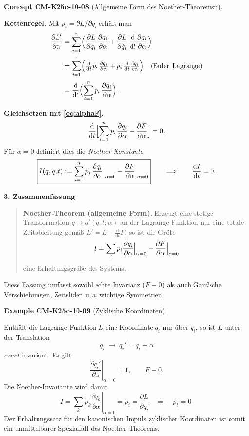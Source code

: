 \documentclass[10pt, letterpaper]{article}
\newcommand{\CustomHeading}[3]{%
  \par\medskip\noindent%
  \textbf{#1 #2} \textnormal{(#3)}.\enskip%
}
\newenvironment{EXA}[2]{\CustomHeading{Example}{#1}{#2}}{}
\newenvironment{CONC}[2]{\CustomHeading{Concept}{#1}{#2}}{}
\begin{document}
\begin{CONC}{CM-K25c-10-08}{Allgemeine Form des Noether-Theoremsn}
\textbf{Kettenregel.}
Mit
\(p_i=\partial L/\partial\dot q_i\) erhält man
\[
\begin{aligned}
  \frac{\partial L'}{\partial\alpha}
  &=\sum_{i=1}^{n}
     \Bigl(
       \frac{\partial L}{\partial q_i}\,
       \frac{\partial q_i}{\partial\alpha}
      +\frac{\partial L}{\partial\dot q_i}\,
       \frac{\mathrm d}{\mathrm dt}
         \frac{\partial q_i}{\partial\alpha}
     \Bigr) \\[2pt]
  &=\sum_{i=1}^{n}
     \Bigl(
       \tfrac{\mathrm d}{\mathrm dt}p_i\,
       \tfrac{\partial q_i}{\partial\alpha}
      +p_i\,
       \tfrac{\mathrm d}{\mathrm dt}
         \tfrac{\partial q_i}{\partial\alpha}
     \Bigr)  \quad\text{(Euler–Lagrange)}\\[2pt]
  &=\frac{\mathrm d}{\mathrm dt}
     \Bigl(
       \sum_{i=1}^{n}p_i\,
       \frac{\partial q_i}{\partial\alpha}
     \Bigr).
\end{aligned}
\]

\textbf{Gleichsetzen mit \eqref{eq:alphaF}.}
\[
  \frac{\mathrm d}{\mathrm dt}
  \Bigl[
    \sum_{i=1}^{n}p_i\,
      \frac{\partial q_i}{\partial\alpha}
    -\frac{\partial F}{\partial\alpha}
  \Bigr]
  =0 .
\]
Für \(\alpha=0\) definiert dies die \emph{Noether-Konstante}
\[
  \boxed{%
    I(q,\dot q,t)
    :=\sum_{i=1}^{n}
        p_i\,
        \Bigl.\frac{\partial q_i}{\partial\alpha}\Bigr|_{\alpha=0}
       -\Bigl.\frac{\partial F}{\partial\alpha}\Bigr|_{\alpha=0}}
  \qquad\Longrightarrow\qquad
  \frac{\mathrm dI}{\mathrm dt}=0 .
\]

\textbf{3. Zusammenfassung}

\begin{quote}
\textbf{Noether-Theorem (allgemeine Form).}\;
Erzeugt eine stetige Transformation
\( q\mapsto q'(q,t;\alpha) \)
an der Lagrange-Funktion nur eine totale Zeitableitung gemäß
\(
 L'\!=\!L+\tfrac{\mathrm d}{\mathrm dt}F
\),
so ist die Größe
\[
  I
  =\sum_{i}p_i
     \Bigl.\frac{\partial q_i}{\partial\alpha}\Bigr|_{\alpha=0}
   -\Bigl.\frac{\partial F}{\partial\alpha}\Bigr|_{\alpha=0}
\]
eine Erhaltungsgröße des Systems.
\end{quote}

Diese Fassung umfasst sowohl echte Invarianz
(\(F\equiv 0\)) als auch Gaußsche Verschiebungen, Zeitsliden
u.\,a. wichtige Symmetrien.
\end{CONC}

\begin{EXA}{CM-K25c-10-09}{Zyklische Koordinaten}
Enthält die Lagrange-Funktion $L$ eine Koordinate $q_i$ nur über
$\dot q_i$, so ist $L$ unter der Translation
\[
  q_i\;\longrightarrow\;q_i' = q_i + \alpha
\]
\emph{exact} invariant.  Es gilt
\[
  \left.\frac{\partial q_i'}{\partial\alpha}\right|_{\alpha=0}=1,
  \qquad
  F\equiv0 .
\]
Die Noether-Invariante wird damit
\[
  I
  =\sum_{k} p_k
     \left.\frac{\partial q_k}{\partial\alpha}\right|_{\alpha=0}
  =p_i=\frac{\partial L}{\partial\dot q_i}
  \quad\Longrightarrow\quad
  \dot p_i = 0 .
\]
Der Erhaltungssatz für den kanonischen Impuls zyklischer Koordinaten
ist somit ein unmittelbarer Spezialfall des Noether-Theorems.
\end{EXA}
\end{document}

